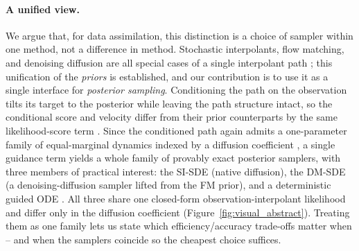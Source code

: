 \paragraph{A unified view.}
We argue that, for data assimilation, this distinction is a choice of sampler within one method, not a difference in method. Stochastic interpolants, flow matching, and denoising diffusion are all special cases of a single interpolant path \cite{albergo_stochastic_2023, lipman_flow_2023, ma_sit_2024, holderrieth_generator_2024}; this unification of the \emph{priors} is established, and our contribution is to use it as a single interface for \emph{posterior sampling}. Conditioning the path on the observation tilts its target to the posterior while leaving the path structure intact, so the conditional score and velocity differ from their prior counterparts by the same likelihood-score term \cite{albergo_stochastic_2023, ma_sit_2024}. Since the conditioned path again admits a one-parameter family of equal-marginal dynamics indexed by a diffusion coefficient \cite{song_score-based_2021}, a single guidance term yields a whole family of provably exact posterior samplers, with three members of practical interest: the SI-SDE (native diffusion), the DM-SDE (a denoising-diffusion sampler lifted from the FM prior), and a deterministic guided ODE \cite{yan_fig_2024, pokle_training-free_2024}. All three share one closed-form observation-interpolant likelihood and differ only in the diffusion coefficient (Figure~\ref{fig:visual_abstract}). Treating them as one family lets us state which efficiency/accuracy trade-offs matter when -- and when the samplers coincide so the cheapest choice suffices.



